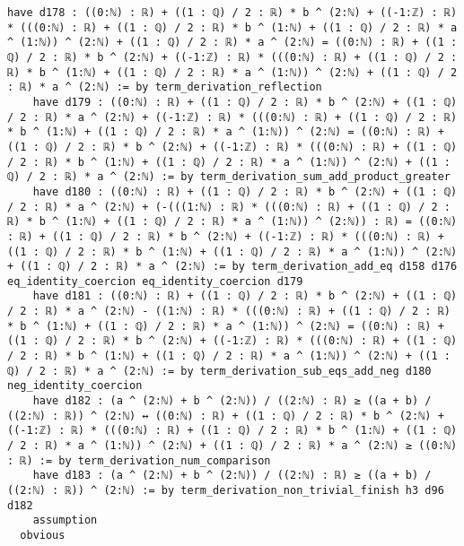 \documentclass{article}
\begin{document}
\begin{tcolorbox}[colback=white!10, width=\linewidth]
\begin{lstlisting}[language=Lean4]
    have d178 : ((0:ℕ) : ℝ) + ((1 : ℚ) / 2 : ℝ) * b ^ (2:ℕ) + ((-1:ℤ) : ℝ) * (((0:ℕ) : ℝ) + ((1 : ℚ) / 2 : ℝ) * b ^ (1:ℕ) + ((1 : ℚ) / 2 : ℝ) * a ^ (1:ℕ)) ^ (2:ℕ) + ((1 : ℚ) / 2 : ℝ) * a ^ (2:ℕ) = ((0:ℕ) : ℝ) + ((1 : ℚ) / 2 : ℝ) * b ^ (2:ℕ) + ((-1:ℤ) : ℝ) * (((0:ℕ) : ℝ) + ((1 : ℚ) / 2 : ℝ) * b ^ (1:ℕ) + ((1 : ℚ) / 2 : ℝ) * a ^ (1:ℕ)) ^ (2:ℕ) + ((1 : ℚ) / 2 : ℝ) * a ^ (2:ℕ) := by term_derivation_reflection
    have d179 : ((0:ℕ) : ℝ) + ((1 : ℚ) / 2 : ℝ) * b ^ (2:ℕ) + ((1 : ℚ) / 2 : ℝ) * a ^ (2:ℕ) + ((-1:ℤ) : ℝ) * (((0:ℕ) : ℝ) + ((1 : ℚ) / 2 : ℝ) * b ^ (1:ℕ) + ((1 : ℚ) / 2 : ℝ) * a ^ (1:ℕ)) ^ (2:ℕ) = ((0:ℕ) : ℝ) + ((1 : ℚ) / 2 : ℝ) * b ^ (2:ℕ) + ((-1:ℤ) : ℝ) * (((0:ℕ) : ℝ) + ((1 : ℚ) / 2 : ℝ) * b ^ (1:ℕ) + ((1 : ℚ) / 2 : ℝ) * a ^ (1:ℕ)) ^ (2:ℕ) + ((1 : ℚ) / 2 : ℝ) * a ^ (2:ℕ) := by term_derivation_sum_add_product_greater
    have d180 : ((0:ℕ) : ℝ) + ((1 : ℚ) / 2 : ℝ) * b ^ (2:ℕ) + ((1 : ℚ) / 2 : ℝ) * a ^ (2:ℕ) + (-(((1:ℕ) : ℝ) * (((0:ℕ) : ℝ) + ((1 : ℚ) / 2 : ℝ) * b ^ (1:ℕ) + ((1 : ℚ) / 2 : ℝ) * a ^ (1:ℕ)) ^ (2:ℕ)) : ℝ) = ((0:ℕ) : ℝ) + ((1 : ℚ) / 2 : ℝ) * b ^ (2:ℕ) + ((-1:ℤ) : ℝ) * (((0:ℕ) : ℝ) + ((1 : ℚ) / 2 : ℝ) * b ^ (1:ℕ) + ((1 : ℚ) / 2 : ℝ) * a ^ (1:ℕ)) ^ (2:ℕ) + ((1 : ℚ) / 2 : ℝ) * a ^ (2:ℕ) := by term_derivation_add_eq d158 d176 eq_identity_coercion eq_identity_coercion d179
    have d181 : ((0:ℕ) : ℝ) + ((1 : ℚ) / 2 : ℝ) * b ^ (2:ℕ) + ((1 : ℚ) / 2 : ℝ) * a ^ (2:ℕ) - ((1:ℕ) : ℝ) * (((0:ℕ) : ℝ) + ((1 : ℚ) / 2 : ℝ) * b ^ (1:ℕ) + ((1 : ℚ) / 2 : ℝ) * a ^ (1:ℕ)) ^ (2:ℕ) = ((0:ℕ) : ℝ) + ((1 : ℚ) / 2 : ℝ) * b ^ (2:ℕ) + ((-1:ℤ) : ℝ) * (((0:ℕ) : ℝ) + ((1 : ℚ) / 2 : ℝ) * b ^ (1:ℕ) + ((1 : ℚ) / 2 : ℝ) * a ^ (1:ℕ)) ^ (2:ℕ) + ((1 : ℚ) / 2 : ℝ) * a ^ (2:ℕ) := by term_derivation_sub_eqs_add_neg d180 neg_identity_coercion
    have d182 : (a ^ (2:ℕ) + b ^ (2:ℕ)) / ((2:ℕ) : ℝ) ≥ ((a + b) / ((2:ℕ) : ℝ)) ^ (2:ℕ) ↔ ((0:ℕ) : ℝ) + ((1 : ℚ) / 2 : ℝ) * b ^ (2:ℕ) + ((-1:ℤ) : ℝ) * (((0:ℕ) : ℝ) + ((1 : ℚ) / 2 : ℝ) * b ^ (1:ℕ) + ((1 : ℚ) / 2 : ℝ) * a ^ (1:ℕ)) ^ (2:ℕ) + ((1 : ℚ) / 2 : ℝ) * a ^ (2:ℕ) ≥ ((0:ℕ) : ℝ) := by term_derivation_num_comparison
    have d183 : (a ^ (2:ℕ) + b ^ (2:ℕ)) / ((2:ℕ) : ℝ) ≥ ((a + b) / ((2:ℕ) : ℝ)) ^ (2:ℕ) := by term_derivation_non_trivial_finish h3 d96 d182
    assumption
  obvious

\end{lstlisting}
\end{tcolorbox}
\end{document}
